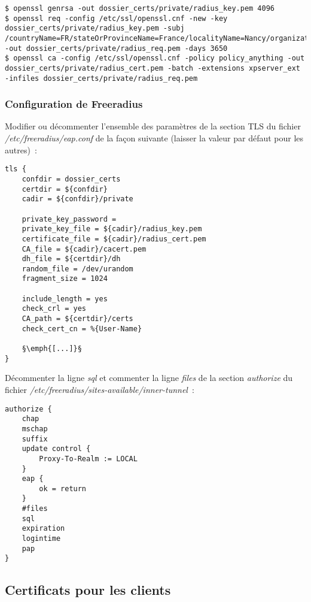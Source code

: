 \begin{lstlisting}
$ openssl genrsa -out dossier_certs/private/radius_key.pem 4096
$ openssl req -config /etc/ssl/openssl.cnf -new -key dossier_certs/private/radius_key.pem -subj /countryName=FR/stateOrProvinceName=France/localityName=Nancy/organizationName=BHConsulting/commonName=nom_serveur_radius/ -out dossier_certs/private/radius_req.pem -days 3650
$ openssl ca -config /etc/ssl/openssl.cnf -policy policy_anything -out dossier_certs/private/radius_cert.pem -batch -extensions xpserver_ext -infiles dossier_certs/private/radius_req.pem
\end{lstlisting}

\subsubsection{Configuration de Freeradius}

Modifier ou décommenter l'ensemble des paramètres de la section TLS du fichier \emph{/etc/freeradius/eap.conf} de la façon suivante (laisser la valeur par défaut pour les autres)~:

\begin{lstlisting}
tls {
	confdir = dossier_certs 
	certdir = ${confdir}
	cadir = ${confdir}/private

	private_key_password =
	private_key_file = ${cadir}/radius_key.pem
	certificate_file = ${cadir}/radius_cert.pem
	CA_file = ${cadir}/cacert.pem
	dh_file = ${certdir}/dh
	random_file = /dev/urandom
	fragment_size = 1024

	include_length = yes
	check_crl = yes
	CA_path = ${certdir}/certs
	check_cert_cn = %{User-Name}

	§\emph{[...]}§
}
\end{lstlisting}

Décommenter la ligne \emph{sql} et commenter la ligne \emph{files} de la section \emph{authorize} du fichier \emph{/etc/freeradius/sites-available/inner-tunnel}~:

\begin{lstlisting}
authorize {
    chap
    mschap
    suffix
    update control {
        Proxy-To-Realm := LOCAL
    }
    eap {
        ok = return
    }
    #files
    sql
    expiration
    logintime
    pap
}
\end{lstlisting}

\subsection{Certificats pour les clients}
